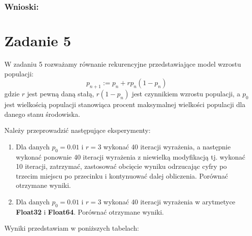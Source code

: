 \documentclass[12pt]{article}
\begin{document}
\subsubsection*{Wnioski:}

\section{Zadanie 5}
W zadaniu 5 rozważamy równanie rekurencyjne przedstawiające model wzrostu populacji:
\begin{equation*}
	p_{n+1} := p_n+rp_n(1-p_n)
\end{equation*}
gdzie $r$ jest pewną daną stałą, $r(1-p_n)$ jest czynnikiem wzrostu populacji, a $p_0$ jest wielkością populacji stanowiąca procent maksymalnej wielkości populacji dla danego stanu środowiska.

Należy przeprowadzić następujące eksperymenty:
\begin{enumerate}
	\item{Dla danych $p_0 = 0.01$ i $r = 3$ wykonać 40 iteracji wyrażenia, a następnie wykonać ponownie 40 iteracji wyrażenia z niewielką modyfikacją tj. wykonać 10 iteracji, zatrzymać, zastosować obcięcie wyniku odrzucając cyfry po trzecim miejscu po przecinku i kontynuować dalej obliczenia. Porównać otrzymane wyniki.}
	\item{Dla danych $p_0 = 0.01$ i $r = 3$ wykonać 40 iteracji wyrażenia w arytmetyce \textbf{Float32} i \textbf{Float64}. Porównać otrzymane wyniki.}
\end{enumerate}

Wyniki przedstawiam w poniższych tabelach:
\end{document}

